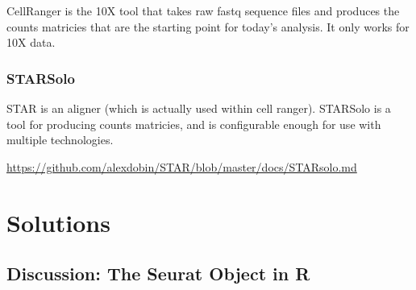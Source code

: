 \documentclass[
]{book}
\begin{document}
CellRanger is the 10X tool that takes raw fastq sequence files and produces the counts matricies that are the starting point for today's analysis. It only works for 10X data.

\subsection*{STARSolo}\label{starsolo}

STAR is an aligner (which is actually used within cell ranger). STARSolo is a tool for producing counts matricies, and is configurable enough for use with multiple technologies.

\url{https://github.com/alexdobin/STAR/blob/master/docs/STARsolo.md}

\chapter{Solutions}\label{solutions}

\section{Discussion: The Seurat Object in R}\label{discussion-the-seurat-object-in-r-1}
\end{document}
